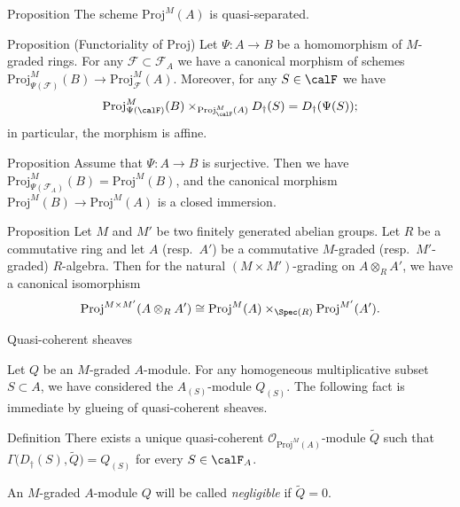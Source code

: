 \documentclass[9pt]{beamer}
\begin{document}
\begin{frame}

\begin{block}{Proposition} 
The scheme $\mathrm{Proj}^M(A)$ is quasi-separated.
\end{block}

\begin{block}{Proposition (Functoriality of Proj)} 
Let $\Psi:A \to B $ be a homomorphism of $M$-graded rings. 
For any $\mathcal{F} \subset \mathcal{F}_A$ 
we have a canonical morphism of schemes $\mathrm{Proj}^M_{\Psi (\mathcal{F})} (B) \to \mathrm{Proj}^M_{\mathcal{F} } (A)$. Moreover, for any $S \in \calF$ we have
\begin{equation}
\mathrm{Proj}^M_{\Psi(\calF)}(B) \times_{\mathrm{Proj}_{\calF}^M(A)} D_\dag(S) = D_\dag(\Psi(S));
\end{equation}
in particular, the morphism is affine.
\end{block}

\begin{block}{Proposition}
Assume that $\Psi : A \to B$ is surjective. Then we have $\mathrm{Proj}^M_{\Psi (\mathcal{F}_A)} (B) = \mathrm{Proj}^M (B)$, and the canonical morphism
 $\mathrm{Proj}^M(B) \to \mathrm{Proj}^M(A)$
is a closed immersion.
\end{block}

 \end{frame}


\begin{frame}

\begin{block}{Proposition}
 Let $M$ and $M'$ be two finitely generated abelian groups. Let $R$ be a commutative ring and let $A$ (resp.~$A'$) be a commutative $M$-graded (resp.~$M'$-graded) $R$-algebra. 
 Then for the natural $(M \times M')$-grading on $A \otimes_R A'$, we have a canonical isomorphism
 \[
 \mathrm{Proj} ^{M \times M'} (A \otimes_R A') \cong \mathrm{Proj} ^M (A) \times_{\Spec(R)} \mathrm{Proj} ^{M'} (A'). 
 \]
\end{block}

\end{frame}



\begin{frame}{Quasi-coherent sheaves}

Let $Q$ be an $M$-graded $A$-module. For any homogeneous multiplicative subset $S \subset A$, we have considered the $A_{(S)}$-module $Q_{(S)}$. The following fact is immediate by glueing of quasi-coherent sheaves.


\begin{block}{Definition}
There exists 
a unique quasi-coherent $\mathcal{O}_{\mathrm{Proj}^M(A)}$-module $\widetilde{Q}$ such that
$\Gamma \bigl( D_\dag(S)  , \widetilde{Q} \bigr) = Q_{(S)}$
for every $S \in \calF_A$.
\end{block}

An $M$-graded $A$-module $Q$ will be called \emph{negligible} if $\widetilde{Q}=0$.


\end{frame}
\end{document}
